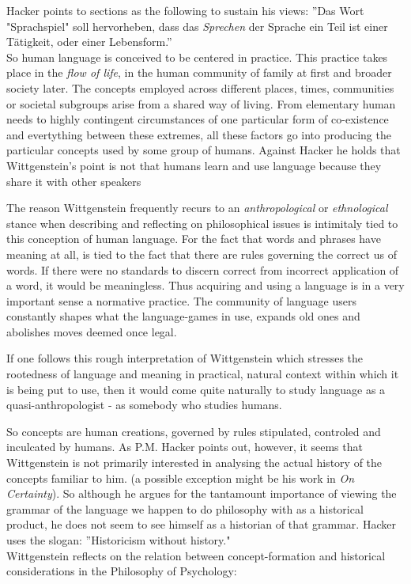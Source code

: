 \documentclass{article}
\begin{document}
Hacker points to sections as the following to sustain his views:
''Das Wort "Sprachspiel" soll hervorheben, dass das \textit{Sprechen} der Sprache ein Teil ist einer T{\"a}tigkeit, oder einer Lebensform.''\\ %
So human language is conceived to be centered in practice. This practice takes place in the \textit{flow of life}, in the human community of family at first and broader society later. The concepts employed across different places, times, communities or societal subgroups arise from a shared way of living. From elementary human needs to highly contingent circumstances of one particular form of co-existence and evertything between these extremes, all these factors go into producing the particular concepts used by some group of humans. Against Hacker he holds that Wittgenstein's point is not that humans learn and use language because they share it with other speakers

The reason Wittgenstein frequently recurs to an \textit{anthropological} or \textit{ethnological} stance when describing and reflecting on philosophical issues is intimitaly tied to this conception of human language. For the fact that words and phrases have meaning at all, is tied to the fact that there are rules governing the correct us of words. If there were no standards to discern correct from incorrect application of a word, it would be meaningless. %
Thus acquiring and using a language is in a very important sense a normative practice. The community of language users constantly shapes what the language-games in use, expands old ones and abolishes moves deemed once legal.

If one follows this rough interpretation of Wittgenstein which stresses the rootedness of language and meaning in practical, natural context within which it is being put to use, then it would come quite naturally to study language as a quasi-anthropologist - as somebody who studies humans.

So concepts are human creations, governed by rules stipulated, controled and inculcated by humans. As P.M. Hacker points out, however, it seems that Wittgenstein is not primarily interested in analysing the actual history of the concepts familiar to him. (a possible exception might be his work in \textit{On Certainty}). So although he argues for the tantamount importance of viewing the grammar of the language we happen to do philosophy with as a historical product, he does not seem to see himself as a historian of that grammar. Hacker uses the slogan: ''Historicism without history."\\
Wittgenstein reflects on the relation between concept-formation and historical considerations in the Philosophy of Psychology:
\end{document}
